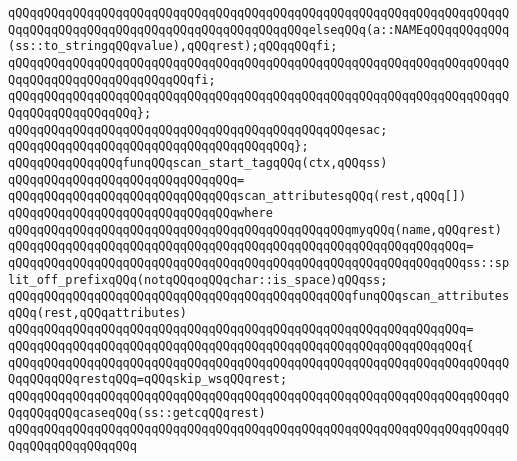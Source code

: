 \verb|qQQqqQQqqQQqqQQqqQQqqQQqqQQqqQQqqQQqqQQqqQQqqQQqqQQqqQQqqQQqqQQqqQQqqQQqqQQqqQQqqQQqqQQqqQQqqQQqqQQqqQQqqQQqqQQqelseqQQq(a::NAMEqQQqqQQqqQQq(ss::to_stringqQQqvalue),qQQqrest);qQQqqQQqfi;|\newline
\verb|qQQqqQQqqQQqqQQqqQQqqQQqqQQqqQQqqQQqqQQqqQQqqQQqqQQqqQQqqQQqqQQqqQQqqQQqqQQqqQQqqQQqqQQqqQQqqQQqfi;|\newline
\verb|qQQqqQQqqQQqqQQqqQQqqQQqqQQqqQQqqQQqqQQqqQQqqQQqqQQqqQQqqQQqqQQqqQQqqQQqqQQqqQQqqQQqqQQq};|\newline
\verb|qQQqqQQqqQQqqQQqqQQqqQQqqQQqqQQqqQQqqQQqqQQqqQQqesac;|\newline
\verb|qQQqqQQqqQQqqQQqqQQqqQQqqQQqqQQqqQQqqQQq};|\newline
\newline
\verb|qQQqqQQqqQQqqQQqfunqQQqscan_start_tagqQQq(ctx,qQQqss)|\newline
\verb|qQQqqQQqqQQqqQQqqQQqqQQqqQQqqQQq=|\newline
\verb|qQQqqQQqqQQqqQQqqQQqqQQqqQQqqQQqscan_attributesqQQq(rest,qQQq[])|\newline
\verb|qQQqqQQqqQQqqQQqqQQqqQQqqQQqqQQqwhere|\newline
\newline
\verb|qQQqqQQqqQQqqQQqqQQqqQQqqQQqqQQqqQQqqQQqqQQqqQQqmyqQQq(name,qQQqrest)|\newline
\verb|qQQqqQQqqQQqqQQqqQQqqQQqqQQqqQQqqQQqqQQqqQQqqQQqqQQqqQQqqQQqqQQq=|\newline
\verb|qQQqqQQqqQQqqQQqqQQqqQQqqQQqqQQqqQQqqQQqqQQqqQQqqQQqqQQqqQQqqQQqss::split_off_prefixqQQq(notqQQqoqQQqchar::is_space)qQQqss;|\newline
\newline
\verb|qQQqqQQqqQQqqQQqqQQqqQQqqQQqqQQqqQQqqQQqqQQqqQQqfunqQQqscan_attributesqQQq(rest,qQQqattributes)|\newline
\verb|qQQqqQQqqQQqqQQqqQQqqQQqqQQqqQQqqQQqqQQqqQQqqQQqqQQqqQQqqQQqqQQq=|\newline
\verb|qQQqqQQqqQQqqQQqqQQqqQQqqQQqqQQqqQQqqQQqqQQqqQQqqQQqqQQqqQQqqQQq{|\newline
\verb|qQQqqQQqqQQqqQQqqQQqqQQqqQQqqQQqqQQqqQQqqQQqqQQqqQQqqQQqqQQqqQQqqQQqqQQqqQQqqQQqrestqQQq=qQQqskip_wsqQQqrest;|\newline
\newline
\verb|qQQqqQQqqQQqqQQqqQQqqQQqqQQqqQQqqQQqqQQqqQQqqQQqqQQqqQQqqQQqqQQqqQQqqQQqqQQqqQQqcaseqQQq(ss::getcqQQqrest)|\newline
\verb|qQQqqQQqqQQqqQQqqQQqqQQqqQQqqQQqqQQqqQQqqQQqqQQqqQQqqQQqqQQqqQQqqQQqqQQqqQQqqQQqqQQqqQQq|\newline
